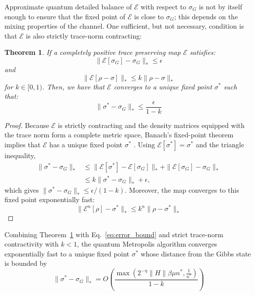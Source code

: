 \documentclass[aps,floatfix,10pt,amssymb,amsfont,amsmath,superscriptaddress,float,nofootinbib,longbibliography,nobalancelastpage,twocolumn]{revtex4-2}
\newtheorem{theorem}{Theorem}
\begin{document}
 Approximate quantum detailed balance of $\mathcal{E}$ with respect to $\sigma_G$ is not by itself enough to ensure that the fixed point of $\mathcal{E}$ is close to $\sigma_G$; this depends on the mixing properties of the channel. One sufficient, but not necessary, condition is that $\mathcal{E}$ is also strictly trace-norm contracting:
 \begin{theorem}
     If a completely positive trace preserving map $\mathcal{E}$ satisfies:
     \begin{equation}
         \|\mathcal{E}[\sigma_G] - \sigma_G\|_* \leq \epsilon
     \end{equation}
     and
 \begin{equation}
     \|\mathcal{E}[\rho-\sigma]\|_* \leq k\|\rho-\sigma\|_*
 \end{equation}
 for $k \in [0,1)$. Then, we have that $\mathcal{E}$ converges to a unique fixed point $\sigma^*$ such that:
 \begin{equation}
     \| \sigma^* -\sigma_G\|_* \leq \frac{\epsilon}{1-k}
 \end{equation}
 \label{theorem:error_bound}
 \end{theorem}
 \begin{proof}
Because $\mathcal{E}$ is strictly contracting and the density matrices equipped with the trace norm form a complete metric space, Banach's fixed-point theorem implies that $\mathcal{E}$ has a unique fixed point $\sigma^*$ \cite{Mart_nez_Pe_a_2023,Raginsky_2002}. Using $\mathcal{E}[\sigma^*]=\sigma^*$ and the triangle inequality,
\begin{align}
 \|\sigma^*-\sigma_G\|_*
 &\leq \|\mathcal{E}[\sigma^*]-\mathcal{E}[\sigma_G]\|_*+\|\mathcal{E}[\sigma_G]-\sigma_G\|_*\\
 &\leq k\|\sigma^*-\sigma_G\|_*+\epsilon,
\end{align}
which gives $\|\sigma^*-\sigma_G\|_*\leq\epsilon/(1-k)$. Moreover, the map converges to this fixed point exponentially fast:
\begin{equation}
     \|\mathcal{E}^n[\rho] -\sigma^*\|_* \leq k^n\| \rho - \sigma^*\|_*
\end{equation}
 \end{proof}

Combining Theorem~\ref{theorem:error_bound} with Eq.~\eqref{eq:error_bound} and strict trace-norm contractivity with $k<1$, the quantum Metropolis algorithm converges exponentially fast to a unique fixed point $\sigma^*$ whose distance from the Gibbs state is bounded by
\begin{equation}
    \|\sigma^*-\sigma_G\|_* = 
    O\left(\frac{\max\left( 2^{-\eta}\|H\|\beta\mu  n^*,\frac{1}{n^*}\right)}{1-k}\right)
\end{equation}
\end{document}
